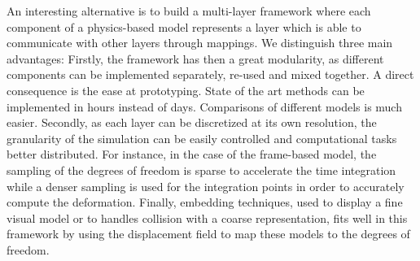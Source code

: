 An interesting alternative is to build a multi-layer framework where each component of a physics-based model represents a layer which is able to communicate with other layers through mappings. 
We distinguish three main advantages:
Firstly, the framework has then a great modularity, as different components can be implemented separately, re-used and mixed together. A direct consequence is the ease at prototyping. 
State of the art methods can be implemented in hours instead of days. 
Comparisons of different models is much easier. 
Secondly, as each layer can be discretized at its own resolution, the granularity of the simulation can be easily controlled and computational tasks better distributed.
For instance, in the case of the frame-based model, the sampling of the degrees of freedom is sparse to accelerate the time integration while a denser sampling is used for the integration points in order to accurately compute the deformation.
Finally, embedding techniques, used to display a fine visual model or to handles collision with a coarse representation, fits well in this framework by using the displacement field to map these models to the degrees of freedom.

